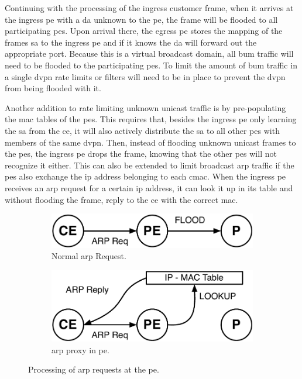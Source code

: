 Continuing with the processing of the ingress customer frame, when it arrives at the ingress \ac{pe} with a \ac{da} unknown to the \ac{pe}, the frame will be flooded to all participating \acp{pe}. Upon arrival there, the egress \ac{pe} stores the mapping of the frames \ac{sa} to the ingress \ac{pe} and if it knows the \ac{da} will forward out the appropriate port. Because this is a virtual broadcast domain, all \ac{bum} traffic will need to be flooded to the participating \acp{pe}. To limit the amount of \ac{bum} traffic in a single \ac{dvpn} rate limits or filters will need to be in place to prevent the \ac{dvpn} from being flooded with it.

Another addition to rate limiting unknown unicast traffic is by pre-populating the \acs{mac} tables of the \acp{pe}. This requires that, besides the ingress \ac{pe} only learning the \ac{sa} from the \ac{ce}, it will also actively distribute the \ac{sa} to all other \acp{pe} with members of the same \ac{dvpn}. Then, instead of flooding unknown unicast frames to the \acp{pe}, the ingress \ac{pe} drops the frame, knowing that the other \acp{pe} will not recognize it either. This can also be extended to limit broadcast \ac{arp} traffic if the \acp{pe} also exchange the \ac{ip} address belonging to each \ac{cmac}. When the ingress \ac{pe} receives an \acs{arp} request for a certain \ac{ip} address, it can look it up in its table and without flooding the frame, reply to the \ac{ce} with the correct \ac{mac}.

\begin{figure}[!h]
	\centering
	\begin{subfigure}[b]{0.3\textwidth}
		\centering
		\includegraphics[width=\textwidth]{./includes/arp-no-proxy.pdf}
		\caption{Normal \acs{arp} Request.}
		\label{fig:arp-no-proxy}
	\end{subfigure}\hspace*{1cm}
	\begin{subfigure}[b]{0.3\textwidth}
	\centering
		\includegraphics[width=\textwidth]{./includes/arp-proxy.pdf}
		\caption{\acs{arp} proxy in \ac{pe}.}
		\label{fig:arp-proxy}
	\end{subfigure}
	\caption{Processing of \acs{arp} requests at the \ac{pe}.}
\end{figure}


